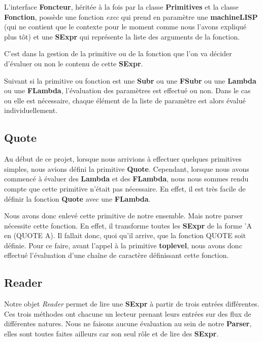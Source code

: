 \documentclass[a4paper, 11pt]{article}
\numberwithin{equation}{section}
\theoremstyle{definition}
\begin{document}
L'interface {\bfseries Foncteur}, héritée à la fois par la classe {\bfseries Primitives} et la classe {\bfseries Fonction}, possède une fonction \textit{exec} qui prend en paramètre une {\bfseries machineLISP} (qui ne contient que le contexte pour le moment comme nous l'avons expliqué plus tôt) et une {\bfseries SExpr} qui représente la liste des arguments de la fonction.

C'est dans la gestion de la primitive ou de la fonction que l'on va décider d'évaluer ou non le contenu de cette {\bfseries SExpr}. 

Suivant si la primitive ou fonction est une {\bfseries Subr} ou une {\bfseries FSubr} ou une {\bfseries Lambda} ou une {\bfseries FLambda}, l'évaluation des paramètres est effectué ou non. Dans le cas ou elle est nécessaire, chaque élément de la liste de paramètre est alors évalué individuellement.

\subsection{Quote}

Au début de ce projet, lorsque nous arrivions à effectuer quelques primitives simples, nous avions défini la primitive {\bfseries Quote}. Cependant, lorsque nous avons commencé à évaluer des {\bfseries Lambda} et des {\bfseries FLambda}, nous nous sommes rendu compte que cette primitive n'était pas nécessaire. En effet, il est très facile de définir la fonction {\bfseries Quote} avec une {\bfseries FLambda}.

Nous avons donc enlevé cette primitive de notre ensemble. Mais notre parser nécessite cette fonction. En effet, il transforme toutes les {\bfseries SExpr} de la forme 'A en (QUOTE A). Il fallait donc, quoi qu'il arrive, que la fonction QUOTE soit définie. Pour ce faire, avant l'appel à la primitive {\bfseries toplevel}, nous avons donc effectué l'évaluation d'une chaîne de caractère définissant cette fonction.

\subsection{Reader}

Notre objet \textit{Reader} permet de lire une {\bfseries SExpr} à partir de trois entrées différentes. Ces trois méthodes ont chacune un lecteur prenant leurs entrées sur des flux de différentes natures. Nous ne faisons aucune évaluation au sein de notre {\bfseries Parser}, elles sont toutes faites ailleurs car son seul rôle et de lire des {\bfseries SExpr}.
\end{document}
